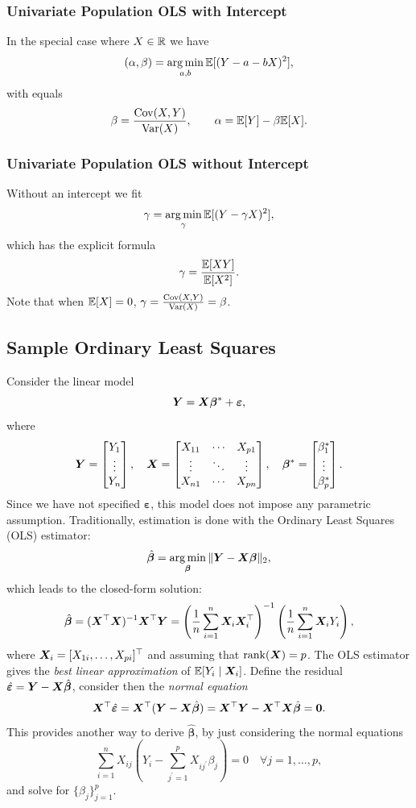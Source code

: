 \documentclass[11pt]{exam}
\begin{document}
\subsubsection{Univariate Population OLS with Intercept}
In the special case where $X \in \mathbb{R}$ we have 
\[
    (\alpha, \beta) = \operatorname*{arg\,min}_{a, b} \mathbb{E}[(Y - a - bX)^2],
\]
with equals
\[
    \beta = \frac{\mathrm{Cov}(X, Y)}{\mathrm{Var}(X)}, \qquad \alpha = \mathbb{E}[Y] - \beta \mathbb{E}[X].
\]

\subsubsection{Univariate Population OLS without Intercept}
Without an intercept we fit
\[
    \gamma = \operatorname*{arg\,min}_{\gamma} \mathbb{E}[(Y - \gamma X)^2],
\]
which has the explicit formula
\[
    \gamma = \frac{\mathbb{E}[XY]}{\mathbb{E}[X^2]}.
\]
Note that when $\mathbb{E}[X] = 0$, $\gamma = \frac{\mathrm{Cov}(X, Y)}{\mathrm{Var}(X)} = \beta$.


\subsection{Sample Ordinary Least Squares}
Consider the linear model
\[
    \bm{Y} = \bm{X} \bm{\beta}^\ast + \bm{\varepsilon},
\]
where
  \[
  \bm{Y} =
  \begin{bmatrix}
  Y_1 \\ \vdots \\ Y_n
  \end{bmatrix}, \quad
  \bm{X} =
  \begin{bmatrix}
  X_{11} & \cdots & X_{p1} \\
  \vdots & \ddots & \vdots \\
  X_{n1} & \cdots & X_{pn}
  \end{bmatrix}, \quad
  \bm{\beta}^\ast =
  \begin{bmatrix}
  \beta^\ast_1 \\ \vdots \\ \beta^\ast_p
  \end{bmatrix}.
\]
Since we have not specified $\bm{\varepsilon}$, this model does not impose any parametric assumption. Traditionally, estimation is done with the Ordinary Least Squares (OLS) estimator:
\[
    \hat{\bm{\beta}} = \operatorname*{arg\,min}_{\bm{\beta}} \|\bm{Y} - \bm{X} \bm{\beta}\|_2,
  \]
  which leads to the closed-form solution:
  \[
    \hat{\bm{\beta}} = (\bm{X}^\top \bm{X})^{-1} \bm{X}^\top \bm{Y}
    = \left(\frac{1}{n}\sum_{i=1}^n \bm{X}_i \bm{X}_i^\top\right)^{-1}
      \left(\frac{1}{n}\sum_{i=1}^n \bm{X}_i Y_i\right),
  \]
  where $\bm{X}_i = [X_{1i}, \ldots, X_{pi}]^\top$ and assuming that $\mathrm{rank}(\bm{X}) = p$.
The OLS estimator gives the \emph{best linear approximation} of $\mathbb{E}[Y_i \mid \bm{X}_i]$. Define the residual $\hat{\bm{\varepsilon}} = \bm{Y} - \bm{X} \hat{\bm{\beta}}$, consider then the \emph{normal equation}
\[
    \bm{X}^\top \hat{\bm{\varepsilon}} = \bm{X}^\top (\bm{Y} - \bm{X} \hat{\bm{\beta}}) = \bm{X}^\top \bm{Y} - \bm{X}^\top \bm{X} \hat{\bm{\beta}} = \bm{0}.
\]
This provides another way to derive $\hat{\bm{\beta}}$, by just considering the normal equations
\[
\sum_{i = 1}^n X_{ij} \left(Y_i - \sum_{j^\prime=1}^p X_{ij^\prime} \beta_j\right) = 0 \quad \forall j = 1, \ldots, p,
\]
and solve for $\{\beta_j\}_{j=1}^p$.
\end{document}
